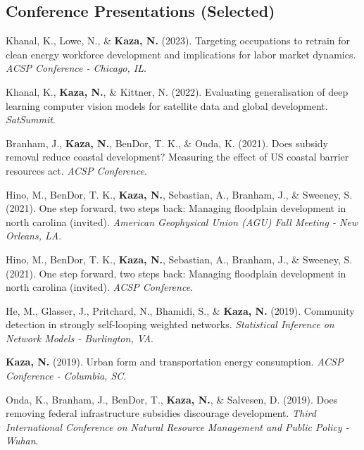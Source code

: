 \documentclass[11pt,a4paper,]{awesome-cv}
\newlength{\cslhangindent}
\newenvironment{CSLReferences}[2] %
 {\begin{list}{}{%
  \setlength{\itemindent}{0pt}
  \setlength{\leftmargin}{0pt}
  \setlength{\parsep}{0pt}
  \ifodd #1
   \setlength{\leftmargin}{\cslhangindent}
   \setlength{\itemindent}{-1\cslhangindent}
  \fi
  \setlength{\itemsep}{#2\baselineskip}}}
 {\end{list}}
\begin{document}
\subsection{Conference Presentations
(Selected)}\label{conference-presentations-selected}

\label{refs-ef0e8a783b89fcb690bead49a24d2354}
\begin{CSLReferences}{1}{0}
Khanal, K., Lowe, N., \& \textbf{Kaza, N.} (2023). Targeting occupations
to retrain for clean energy workforce development and implications for
labor market dynamics. \emph{ACSP Conference - Chicago, IL}.

Khanal, K., \textbf{Kaza, N.}, \& Kittner, N. (2022). Evaluating
generalisation of deep learning computer vision models for satellite
data and global development. \emph{SatSummit}.

Branham, J., \textbf{Kaza, N.}, BenDor, T. K., \& Onda, K. (2021). Does
subsidy removal reduce coastal development? Measuring the effect of US
coastal barrier resources act. \emph{ACSP Conference}.

Hino, M., BenDor, T. K., \textbf{Kaza, N.}, Sebastian, A., Branham, J.,
\& Sweeney, S. (2021). One step forward, two steps back: Managing
floodplain development in north carolina (invited). \emph{American
Geophysical Union (AGU) Fall Meeting - New Orleans, LA}.

Hino, M., BenDor, T. K., \textbf{Kaza, N.}, Sebastian, A., Branham, J.,
\& Sweeney, S. (2021). One step forward, two steps back: Managing
floodplain development in north carolina (invited). \emph{ACSP
Conference}.

He, M., Glasser, J., Pritchard, N., Bhamidi, S., \& \textbf{Kaza, N.}
(2019). Community detection in strongly self-looping weighted networks.
\emph{Statistical Inference on Network Models - Burlington, VA}.

\textbf{Kaza, N.} (2019). Urban form and transportation energy
consumption. \emph{ACSP Conference - Columbia, SC}.

Onda, K., Branham, J., BenDor, T., \textbf{Kaza, N.}, \& Salvesen, D.
(2019). Does removing federal infrastructure subsidies discourage
development. \emph{Third International Conference on Natural Resource
Management and Public Policy - Wuhan}.


\end{CSLReferences}
\end{document}
